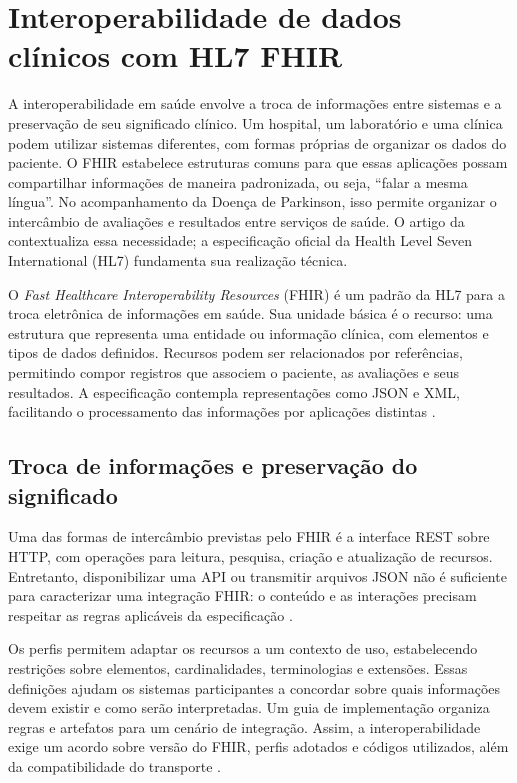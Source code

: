 \section{Interoperabilidade de dados clínicos com HL7 FHIR}
\label{sec:hl7-fhir}

A interoperabilidade em saúde envolve a troca de informações entre sistemas e a preservação de seu significado clínico. Um hospital, um laboratório e uma clínica podem utilizar sistemas diferentes, com formas próprias de organizar os dados do paciente. O FHIR estabelece estruturas comuns para que essas aplicações possam compartilhar informações de maneira padronizada, ou seja, ``falar a mesma língua''. No acompanhamento da Doença de Parkinson, isso permite organizar o intercâmbio de avaliações e resultados entre serviços de saúde. O artigo da  contextualiza essa necessidade; a especificação oficial da Health Level Seven International (HL7) fundamenta sua realização técnica.

O \textit{Fast Healthcare Interoperability Resources} (FHIR) é um padrão da HL7 para a troca eletrônica de informações em saúde. Sua unidade básica é o recurso: uma estrutura que representa uma entidade ou informação clínica, com elementos e tipos de dados definidos. Recursos podem ser relacionados por referências, permitindo compor registros que associem o paciente, as avaliações e seus resultados. A especificação contempla representações como JSON e XML, facilitando o processamento das informações por aplicações distintas \cite{hl7FHIRoverview2023}.

\subsection{Troca de informações e preservação do significado}

Uma das formas de intercâmbio previstas pelo FHIR é a interface REST sobre HTTP, com operações para leitura, pesquisa, criação e atualização de recursos. Entretanto, disponibilizar uma API ou transmitir arquivos JSON não é suficiente para caracterizar uma integração FHIR: o conteúdo e as interações precisam respeitar as regras aplicáveis da especificação \cite{hl7FHIRhttp2023}.

Os perfis permitem adaptar os recursos a um contexto de uso, estabelecendo restrições sobre elementos, cardinalidades, terminologias e extensões. Essas definições ajudam os sistemas participantes a concordar sobre quais informações devem existir e como serão interpretadas. Um guia de implementação organiza regras e artefatos para um cenário de integração. Assim, a interoperabilidade exige um acordo sobre versão do FHIR, perfis adotados e códigos utilizados, além da compatibilidade do transporte \cite{hl7FHIRprofiling2023}.

